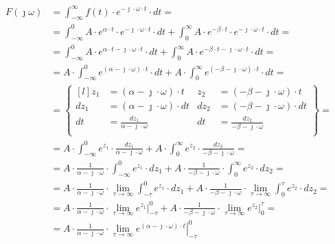 \begin{task}
\begin{align*}
F(\jmath \omega )&=\int_{-\infty }^{\infty}f(t) \cdot e^{-\jmath \cdot \omega \cdot t}\cdot dt=\\
&=\int_{-\infty}^{0} A \cdot e^{\alpha \cdot t} \cdot e^{-\jmath \cdot \omega \cdot t}\cdot dt
+\int_{0}^{\infty} A \cdot e^{-\beta \cdot t} \cdot e^{-\jmath \cdot \omega \cdot t}\cdot dt=\\
&=\int_{-\infty}^{0} A \cdot e^{\alpha \cdot t-\jmath \cdot \omega \cdot t}\cdot dt
+\int_{0}^{\infty} A \cdot e^{-\beta \cdot t -\jmath \cdot \omega \cdot t}\cdot dt=\\
&=A \cdot \int_{-\infty}^{0} e^{\left(\alpha -\jmath \cdot \omega \right)\cdot t}\cdot dt
+A \cdot \int_{0}^{\infty} e^{\left(-\beta -\jmath \cdot \omega \right) \cdot t}\cdot dt=\\
&=\begin{Bmatrix*}[l]%
z_1 &= \left(\alpha -\jmath \cdot \omega \right)\cdot t & z_2&=\left(-\beta -\jmath \cdot \omega \right) \cdot t\\
dz_1&=\left(\alpha -\jmath \cdot \omega \right)\cdot dt & dz_2&=\left(-\beta -\jmath \cdot \omega \right) \cdot dt\\
dt&=\frac{dz_1}{\alpha -\jmath \cdot \omega } & dt&=\frac{dz_2}{-\beta -\jmath \cdot \omega }\\
\end{Bmatrix*}=\\
&=A \cdot \int_{-\infty}^{0} e^{z_1}\cdot \frac{dz_1}{\alpha -\jmath \cdot \omega }
+A \cdot \int_{0}^{\infty} e^{z_2}\cdot \frac{dz_2}{-\beta -\jmath \cdot \omega }=\\
&=A \cdot \frac{1}{\alpha -\jmath \cdot \omega } \cdot \int_{-\infty}^{0} e^{z_1}\cdot dz_1
+A \cdot \frac{1}{-\beta -\jmath \cdot \omega } \cdot \int_{0}^{\infty} e^{z_2}\cdot dz_2=\\
&=A \cdot \frac{1}{\alpha -\jmath \cdot \omega } \cdot \lim_{\tau \rightarrow \infty } \int_{-\tau}^{0} e^{z_1}\cdot dz_1
+A \cdot \frac{1}{-\beta -\jmath \cdot \omega } \cdot \lim_{\tau \rightarrow \infty } \int_{0}^{\tau} e^{z_2}\cdot dz_2=\\
&=A \cdot \frac{1}{\alpha -\jmath \cdot \omega } \cdot \lim_{\tau \rightarrow \infty } \left. e^{z_1}\right|_{-\tau}^{0}
+A \cdot \frac{1}{-\beta -\jmath \cdot \omega } \cdot \lim_{\tau \rightarrow \infty } \left. e^{z_2}\right|_{0}^{\tau}=\\
&=A \cdot \frac{1}{\alpha -\jmath \cdot \omega } \cdot \lim_{\tau \rightarrow \infty } \left. e^{\left(\alpha -\jmath \cdot \omega \right)\cdot t}\right|_{-\tau}^{0}

\end{align*}
\end{task}
